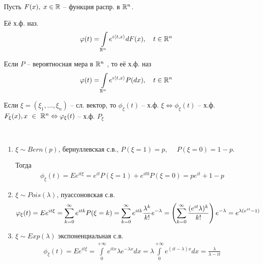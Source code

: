 \begin{definition}
  Пусть $F(x), \; x \in \mathbb{R}$ -- функция распр. в $\mathbb{R}^n$.

  Её х.ф. наз.
  \begin{align*}
    \varphi(t) = \int\limits_{\mathbb{R}^n} e^{i \langle t, x \rangle} dF(x),\quad t \in \mathbb{R}^n
  \end{align*}

  Если $P$ -- вероятносная мера в $\mathbb{R}^n$ , то её х.ф. наз
  \begin{align*}
    \varphi(t) = \int\limits_{\mathbb{R}^n} e^{i \langle t, x \rangle} P(dx),\quad t \in \mathbb{R}^n
  \end{align*}
\end{definition}

\begin{corollary}
  Если $\xi = (\xi_1, \ldots, \xi_n)$ -- сл. вектор, то
  $\phi_\xi(t)$ -- х.ф. $\xi \Leftrightarrow \phi_\xi(t)$ -- х.ф. $F_\xi (x), x~\in~\mathbb{R}^n
  \Leftrightarrow \varphi_\xi (t)$ -- х.ф. $P_\xi$
\end{corollary}

\begin{example}~
  \begin{enumerate}
    \item
      $\xi \sim Bern(p)$, бернуллевская с.в.,
      $P(\xi = 1) = p,\quad \; P(\xi = 0) = 1 - p$.

      Тогда 
      \begin{align*}
        \phi_\xi (t) = E e^{i t \xi} = e^{i t} P (\xi = 1) + e^{i t 0} P(\xi = 0) 
        = p e^{it} + 1 - p
      \end{align*}

    \item
      $\xi \sim Pois(\lambda)$, пуассоновская с.в.
      \begin{align*}
        \varphi_\xi (t) = E e^{i t \xi} = \sum_{k = 0}^{\infty} e^{i t k} P(\xi = k) 
        = \sum_{k = 0}^{\infty} e^{i t k} \frac{\lambda^k}{k!} e^{-\lambda} 
        = \left( \sum_{k = 0}^{\infty} \frac{(e^{i t} \lambda)^k}{k!} \right) e^{-\lambda}
        = e^{\lambda(e^{it} - 1)}
      \end{align*}

    \item
      $\xi \sim Exp(\lambda)$ экспоненциальная с.в.
      \begin{align*}
        \phi_\xi (t) = E e^{i t \xi} = \int\limits_{0}^{+\infty} e^{i t x} \lambda e^{-\lambda x} dx 
        = \lambda \int\limits_{0}^{+\infty} e^{(it - \lambda) x} dx = \frac{\lambda}{\lambda - i t}
      \end{align*}
  \end{enumerate}
\end{example}

